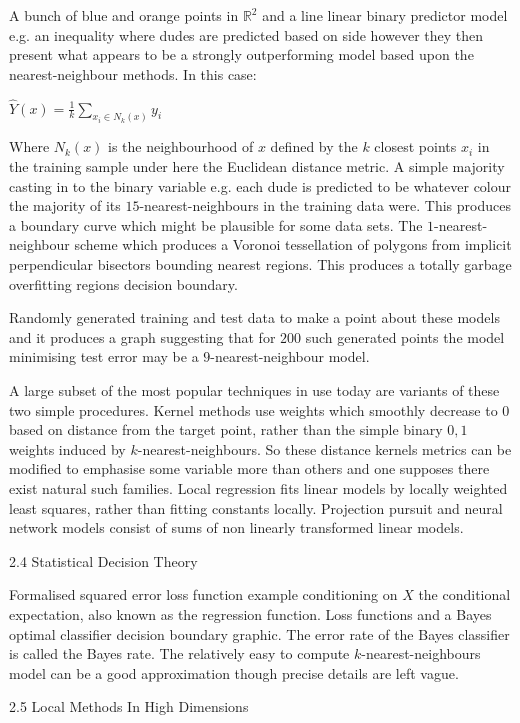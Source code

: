 A bunch of blue and orange points in $\mathbb{R}^2$ and a line linear binary predictor model e.g. an inequality where dudes are predicted based on side however they then present what appears to be a strongly outperforming model based upon the nearest-neighbour methods. In this case:

$\hat{Y}(x) = \frac{1}{k} \sum_{x_i \in N_k (x)} y_i$

Where $N_k(x)$ is the neighbourhood of $x$ defined by the $k$ closest points $x_i$ in the training sample under here the Euclidean distance metric. A simple majority casting in to the binary variable e.g. each dude is predicted to be whatever colour the majority of its $15$-nearest-neighbours in the training data were. This produces a boundary curve which might be plausible for some data sets. The $1$-nearest-neighbour scheme which produces a Voronoi tessellation of polygons from implicit perpendicular bisectors bounding nearest regions. This produces a totally garbage overfitting regions decision boundary.

Randomly generated training and test data to make a point about these models and it produces a graph suggesting that for $200$ such generated points the model minimising test error may be a $9$-nearest-neighbour model.

A large subset of the most popular techniques in use today are variants of these two simple procedures. Kernel methods use weights which smoothly decrease to $0$ based on distance from the target point, rather than the simple binary $0,1$ weights induced by $k$-nearest-neighbours. So these distance kernels metrics can be modified to emphasise some variable more than others and one supposes there exist natural such families. Local regression fits linear models by locally weighted least squares, rather than fitting constants locally. Projection pursuit and neural network models consist of sums of non linearly transformed linear models.

2.4 Statistical Decision Theory

Formalised squared error loss function example conditioning on $X$ the conditional expectation, also known as the regression function. Loss functions and a Bayes optimal classifier decision boundary graphic. The error rate of the Bayes classifier is called the Bayes rate. The relatively easy to compute $k$-nearest-neighbours model can be a good approximation though precise details are left vague.

2.5 Local Methods In High Dimensions

